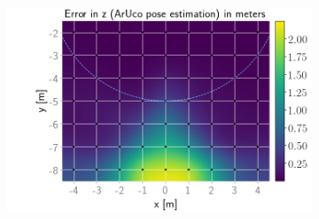 \documentclass[../Head/report.tex]{subfiles}
\begin{document}
\begin{figure}[H]
\begin{subfigure}[t]{.337\textwidth}
        \caption{}
        \label{fig:GPS2Vision_pose_estimation_test1_error_y}
    \end{subfigure}
    \hspace{-0.9em}
    \begin{subfigure}[t]{.337\textwidth}
        \centering
        \includegraphics[width=\textwidth]{../Figures/GPS2Vision_pose_estimation_test/test1_aruco_board_width_0.2_space_0.1/aruco_pose_estimation_error_z.png}
        \caption{}
        \label{fig:GPS2Vision_pose_estimation_test1_error_z}
    \end{subfigure}
    \caption{}
    \label{fig:GPS2Vision_pose_estimation_test1_error_pos}
\end{figure}
\end{document}
